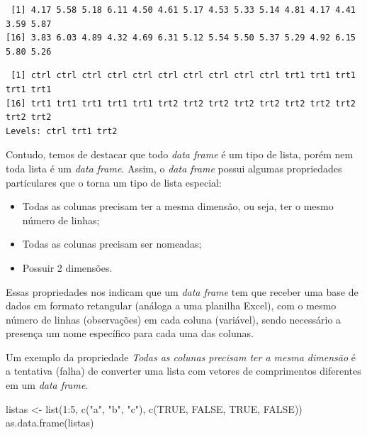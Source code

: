 \documentclass[
  brazilian,
]{book}
\newenvironment{Shaded}{\begin{snugshade}}{\end{snugshade}}
\newcommand{\ConstantTok}[1]{\textcolor[rgb]{0.00,0.00,0.00}{#1}}
\newcommand{\DecValTok}[1]{\textcolor[rgb]{0.00,0.00,0.81}{#1}}
\newcommand{\FunctionTok}[1]{\textcolor[rgb]{0.00,0.00,0.00}{#1}}
\newcommand{\NormalTok}[1]{#1}
\newcommand{\OtherTok}[1]{\textcolor[rgb]{0.56,0.35,0.01}{#1}}
\newcommand{\SpecialCharTok}[1]{\textcolor[rgb]{0.00,0.00,0.00}{#1}}
\newcommand{\StringTok}[1]{\textcolor[rgb]{0.31,0.60,0.02}{#1}}
\begin{document}
\begin{verbatim}
 [1] 4.17 5.58 5.18 6.11 4.50 4.61 5.17 4.53 5.33 5.14 4.81 4.17 4.41 3.59 5.87
[16] 3.83 6.03 4.89 4.32 4.69 6.31 5.12 5.54 5.50 5.37 5.29 4.92 6.15 5.80 5.26
\end{verbatim}

\begin{Shaded}
\end{Shaded}

\begin{verbatim}
 [1] ctrl ctrl ctrl ctrl ctrl ctrl ctrl ctrl ctrl ctrl trt1 trt1 trt1 trt1 trt1
[16] trt1 trt1 trt1 trt1 trt1 trt2 trt2 trt2 trt2 trt2 trt2 trt2 trt2 trt2 trt2
Levels: ctrl trt1 trt2
\end{verbatim}

Contudo, temos de destacar que todo \emph{data frame} é um tipo de lista, porém nem toda lista é um \emph{data frame}. Assim, o \emph{data frame} possui algumas propriedades particulares que o torna um tipo de lista especial:

\begin{itemize}
\item
  Todas as colunas precisam ter a mesma dimensão, ou seja, ter o mesmo número de linhas;
\item
  Todas as colunas precisam ser nomeadas;
\item
  Possuir 2 dimensões.
\end{itemize}

Essas propriedades nos indicam que um \emph{data frame} tem que receber uma base de dados em formato retangular (análoga a uma planilha Excel), com o mesmo número de linhas (observações) em cada coluna (variável), sendo necessário a presença um nome específico para cada uma das colunas.

Um exemplo da propriedade \emph{Todas as colunas precisam ter a mesma dimensão} é a tentativa (falha) de converter uma lista com vetores de comprimentos diferentes em um \emph{data frame}.

\begin{Shaded}
\begin{Highlighting}[]
\NormalTok{listas }\OtherTok{\textless{}{-}} \FunctionTok{list}\NormalTok{(}\DecValTok{1}\SpecialCharTok{:}\DecValTok{5}\NormalTok{, }\FunctionTok{c}\NormalTok{(}\StringTok{"a"}\NormalTok{, }\StringTok{"b"}\NormalTok{, }\StringTok{"c"}\NormalTok{), }\FunctionTok{c}\NormalTok{(}\ConstantTok{TRUE}\NormalTok{, }\ConstantTok{FALSE}\NormalTok{, }\ConstantTok{TRUE}\NormalTok{, }\ConstantTok{FALSE}\NormalTok{))}
\FunctionTok{as.data.frame}\NormalTok{(listas)}
\end{Highlighting}
\end{Shaded}
\end{document}
